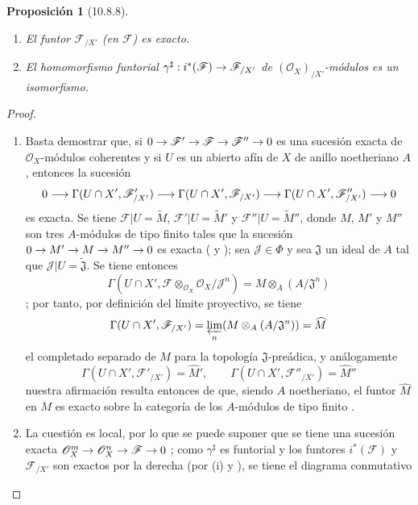 \documentclass[oneside]{amsart}
\theoremstyle{ega-env-style}
\theoremstyle{ega-thm-env-style}
\newtheorem*{proposition}{Proposición}
\theoremstyle{ega-defn-env-style}
\renewcommand{\to}{\mathchoice{\longrightarrow}{\rightarrow}{\rightarrow}{\rightarrow}}
\newcommand{\oldpage}[2][]{{\marginnote{\normalfont{\textbf{#1}~|~#2}}}\ignorespaces}
\let\EGAOriginalLabel\label
\renewcommand{\label}[1]{\phantomsection\EGAOriginalLabel{#1}}
\begin{document}
\begin{proposition}[10.8.8]
\label{I.10.8.8}
\medskip\noindent
\begin{enumerate}
  \item[\rm{(i)}] El funtor $\mathscr{F}_{/X'}$ (en $\mathscr{F}$) es exacto.
  \item[\rm{(ii)}] El homomorfismo funtorial $\gamma^\sharp:i^*(\mathscr{F})\to\mathscr{F}_{/X'}$ de $(\mathscr{O}_X)_{/X'}$-módulos es un isomorfismo.
\end{enumerate}
\end{proposition}

\begin{proof}
\medskip\noindent
\begin{enumerate}
  \item[\rm{(i)}] Basta demostrar que, si $0\to\mathscr{F}'\to\mathscr{F}\to\mathscr{F}''\to0$ es una sucesión exacta de $\mathscr{O}_X$-módulos coherentes y si $U$ es un abierto afín de $X$ de anillo noetheriano $A$, entonces la sucesión
\[
      0\to\Gamma(U\cap X',\mathscr{F}'_{/X'})
      \to\Gamma(U\cap X',\mathscr{F}_{/X'})
      \to\Gamma(U\cap X',\mathscr{F}''_{/X'})\to0
    \]
es exacta.
Se tiene $\mathscr{F}|U=\widetilde M$, $\mathscr{F}'|U=\widetilde{M}'$ y $\mathscr{F}''|U=\widetilde{M}''$, donde $M$, $M'$ y $M''$ son tres $A$-módulos de tipo finito tales que la sucesión $0\to M'\to M\to M''\to0$ es exacta ( y ); sea $\mathscr{J}\in\Phi$ y sea $\mathfrak{J}$ un ideal de $A$ tal que $\mathscr{J}|U=\widetilde{\mathfrak{J}}$.
Se tiene entonces
\[
      \Gamma(U\cap X',
      \mathscr{F}\otimes_{\mathscr{O}_X}\mathscr{O}_X/\mathscr{J}^n)
      =M\otimes_A(A/\mathfrak{J}^n)
    \]
; por tanto, por definición del límite proyectivo, se tiene
\[
      \Gamma(U\cap X',\mathscr{F}_{/X'})
      =\varprojlim_n(M\otimes_A(A/\mathfrak{J}^n))=\widehat M
    \]
el completado separado de $M$ para la topología $\mathfrak{J}$-preádica, y análogamente
\[
      \Gamma(U\cap X',\mathscr{F}'_{/X'})=\widehat{M}',\qquad
      \Gamma(U\cap X',\mathscr{F}''_{/X'})=\widehat{M}''
    \]
nuestra afirmación resulta entonces de que, siendo $A$ noetheriano, el funtor $\widehat M$ en $M$ es exacto sobre la categoría de los $A$-módulos de tipo finito .
\oldpage[I]{197}
  \item[\rm{(ii)}] La cuestión es local, por lo que se puede suponer que se tiene una sucesión exacta $\mathscr{O}_X^m\to\mathscr{O}_X^n\to\mathscr{F}\to0$ ; como $\gamma^\sharp$ es funtorial y los funtores $i^*(\mathscr{F})$ y $\mathscr{F}_{/X'}$ son exactos por la derecha (por (i) y ), se tiene el diagrama conmutativo

\end{enumerate}
\end{proof}
\end{document}
